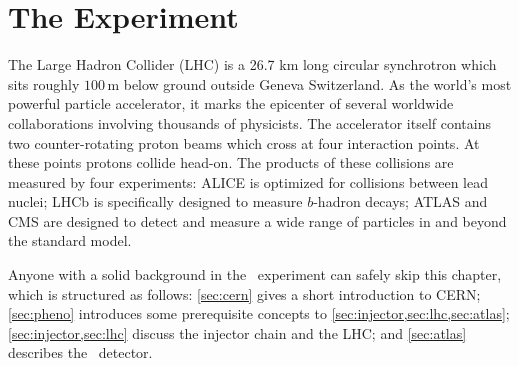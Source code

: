 \chapter{The Experiment}

The Large Hadron Collider (LHC) is a 26.7 km long circular synchrotron which sits roughly $100\,\textrm{m}$ below ground outside Geneva Switzerland.
As the world's most powerful particle accelerator, it marks the epicenter of several worldwide collaborations involving thousands of physicists.
The accelerator itself contains two counter-rotating proton beams which cross at four interaction points. At these points protons collide head-on.
The products of these collisions are measured by four experiments: ALICE is optimized for collisions between lead nuclei; LHCb is specifically designed to measure $b$-hadron decays; ATLAS and CMS are designed to detect and measure a wide range of particles in and beyond the standard model.

Anyone with a solid background in the \atlas\ experiment can safely skip this chapter, which is structured as follows: \cref{sec:cern} gives a short introduction to CERN; \cref{sec:pheno} introduces some prerequisite concepts to \cref{sec:injector,sec:lhc,sec:atlas}; \cref{sec:injector,sec:lhc} discuss the injector chain and the LHC; and \cref{sec:atlas} describes the \atlas\ detector.





